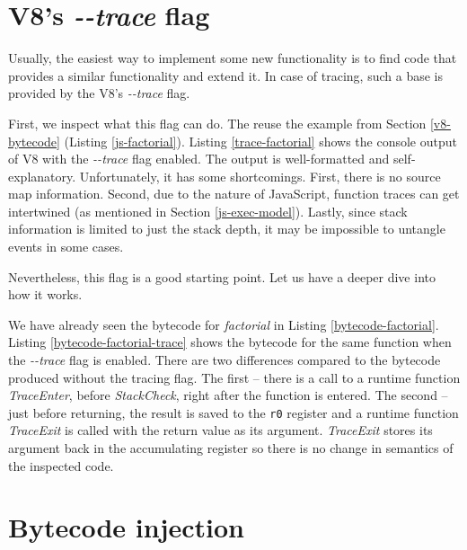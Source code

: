 \section{V8's \emph{-{}-trace} flag}

Usually, the easiest way to implement some new functionality is to find code that provides a similar
functionality and extend it. In case of tracing, such a base is provided by the V8's \emph{-{}-trace} flag.

First, we inspect what this flag can do. The reuse the example from Section \ref{v8-bytecode} (Listing \ref{js-factorial}).
Listing \ref{trace-factorial} shows the console output of V8 with the \emph{-{}-trace} flag enabled. The output is well-formatted and self-explanatory.
Unfortunately, it has some shortcomings. First, there is no source map information. Second, due to the nature of JavaScript,
function traces can get intertwined (as mentioned in Section \ref{js-exec-model}). Lastly, since stack information is limited to
just the stack depth, it may be impossible to untangle events in some cases.



Nevertheless, this flag is a good starting point. Let us have a deeper dive into how it works.

We have already seen the bytecode for \emph{factorial} in Listing \ref{bytecode-factorial}.
Listing \ref{bytecode-factorial-trace} shows the bytecode for the same function when the \emph{-{}-trace}
flag is enabled. There are two differences compared to the bytecode produced without the tracing flag.
The first -- there is a call to a runtime function \emph{TraceEnter}, before \emph{StackCheck}, right after the function is entered. 
The second -- just before returning, the result is saved to the \texttt{r0} register and a runtime function \emph{TraceExit} is called
with the return value as its argument. \emph{TraceExit} stores its argument back in the accumulating register so there
is no change in semantics of the inspected code.




\section{Bytecode injection}
\label{v8-bytecode-injection}

